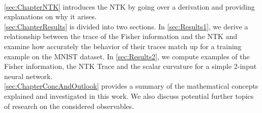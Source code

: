 \\
\cref{sec:ChapterNTK} introduces the NTK by going over a derivation and providing explanations on why it arises.\\
\cref{sec:ChapterResults} is divided into two sections. In \cref{sec:Results1}, we derive a relationship between the trace of the Fisher information and the NTK and examine how accurately the behavior of their traces match up for a training example on the MNIST dataset. In \cref{sec:Results2}, we compute examples of the Fisher information, the NTK Trace and the scalar curvature for a simple 2-input neural network.\\
\cref{sec:ChapterConcAndOutlook} provides a summary of the mathematical concepts explained and investigated in this work. We also discuss potential further topics of research on the considered observables.